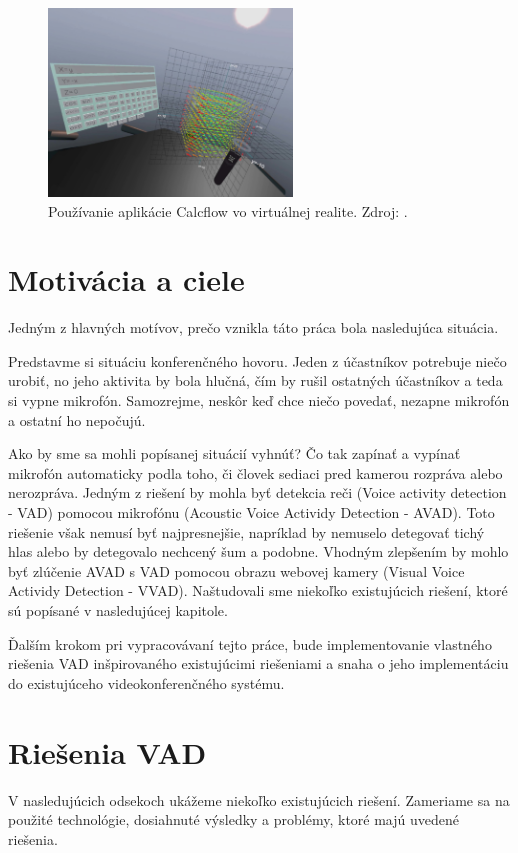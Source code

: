 \begin{figure}[H]
	\begin{center}
		\includegraphics[height=5cm]{pics/calcFlow.jpg}
		\caption{Používanie aplikácie Calcflow vo virtuálnej realite. 
		Zdroj: \cite{calcFlow}.}
		\label{pic-calcFlow}
	\end{center}
\end{figure}

\chapter{Motivácia a ciele}
Jedným z hlavných motívov, prečo vznikla táto práca bola nasledujúca situácia. 

Predstavme si situáciu konferenčného hovoru. 
Jeden z účastníkov potrebuje niečo urobiť, no jeho aktivita by bola hlučná, čím by rušil ostatných účastníkov a teda si vypne mikrofón. 
Samozrejme, neskôr keď chce niečo povedať, nezapne mikrofón a ostatní ho nepočujú.

Ako by sme sa mohli popísanej situácií vyhnúť? 
Čo tak zapínať a vypínať mikrofón automaticky podla toho, či človek sediaci pred kamerou rozpráva alebo nerozpráva.
Jedným z riešení by mohla byť detekcia reči (Voice activity detection - VAD) pomocou mikrofónu (Acoustic Voice Actividy Detection - AVAD).
Toto riešenie však nemusí byť najpresnejšie, napríklad by nemuselo detegovať tichý hlas alebo by detegovalo nechcený šum a podobne.
Vhodným zlepšením by mohlo byť zlúčenie AVAD s VAD pomocou obrazu webovej kamery (Visual Voice Actividy Detection - VVAD).
Naštudovali sme niekoľko existujúcich riešení, ktoré sú popísané v nasledujúcej kapitole.

Ďalším krokom pri vypracovávaní tejto práce, bude implementovanie vlastného riešenia VAD inšpirovaného existujúcimi riešeniami a snaha o jeho implementáciu do existujúceho videokonferenčného systému. 

\chapter{Riešenia VAD}
V nasledujúcich odsekoch ukážeme niekoľko existujúcich riešení.
Zameriame sa na použité technológie, dosiahnuté výsledky a problémy, ktoré majú uvedené riešenia.\\

